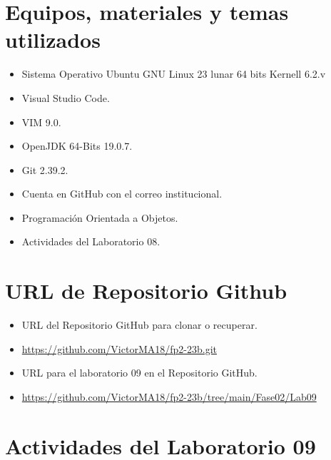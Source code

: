 \documentclass{article}
\begin{document}
	\section{Equipos, materiales y temas utilizados}
	\begin{itemize}
		\item Sistema Operativo Ubuntu GNU Linux 23 lunar 64 bits Kernell 6.2.v
		\item Visual Studio Code.
		\item VIM 9.0.
		\item OpenJDK 64-Bits 19.0.7.
		\item Git 2.39.2.
		\item Cuenta en GitHub con el correo institucional.
		\item Programación Orientada a Objetos.
		\item Actividades del Laboratorio 08.	
	\end{itemize}
	
	\section{URL de Repositorio Github}
	\begin{itemize}
		\item URL del Repositorio GitHub para clonar o recuperar.
		\item \url{https://github.com/VictorMA18/fp2-23b.git}
		\item URL para el laboratorio 09 en el Repositorio GitHub.
		\item \url{https://github.com/VictorMA18/fp2-23b/tree/main/Fase02/Lab09}
	\end{itemize}
	
	\section{Actividades del Laboratorio 09}
\end{document}

